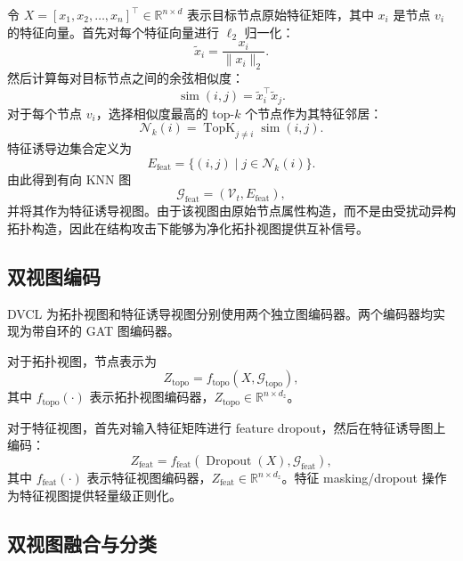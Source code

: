 令 $X=[x_1,x_2,\ldots,x_n]^\top\in\mathbb{R}^{n\times d}$ 表示目标节点原始特征矩阵，其中 $x_i$ 是节点 $v_i$ 的特征向量。首先对每个特征向量进行 $\ell_2$ 归一化：
\begin{equation}
\tilde{x}_i
=
\frac{x_i}{\|x_i\|_2}.
\end{equation}
然后计算每对目标节点之间的余弦相似度：
\begin{equation}
\operatorname{sim}(i,j)
=
\tilde{x}_i^\top \tilde{x}_j.
\end{equation}
对于每个节点 $v_i$，选择相似度最高的 top-$k$ 个节点作为其特征邻居：
\begin{equation}
\mathcal{N}_k(i)
=
\operatorname{TopK}_{j\neq i}
\operatorname{sim}(i,j).
\end{equation}
特征诱导边集合定义为
\begin{equation}
E_{\mathrm{feat}}
=
\{(i,j)\mid j\in\mathcal{N}_k(i)\}.
\end{equation}
由此得到有向 KNN 图
\begin{equation}
\mathcal{G}_{\mathrm{feat}}
=
(\mathcal{V}_t,E_{\mathrm{feat}}),
\end{equation}
并将其作为特征诱导视图。由于该视图由原始节点属性构造，而不是由受扰动异构拓扑构造，因此在结构攻击下能够为净化拓扑视图提供互补信号。

\subsection{双视图编码}

DVCL 为拓扑视图和特征诱导视图分别使用两个独立图编码器。两个编码器均实现为带自环的 GAT 图编码器。

对于拓扑视图，节点表示为
\begin{equation}
Z_{\mathrm{topo}}
=
f_{\mathrm{topo}}(X,\mathcal{G}_{\mathrm{topo}}),
\end{equation}
其中 $f_{\mathrm{topo}}(\cdot)$ 表示拓扑视图编码器，$Z_{\mathrm{topo}}\in\mathbb{R}^{n\times d_z}$。

对于特征视图，首先对输入特征矩阵进行 feature dropout，然后在特征诱导图上编码：
\begin{equation}
Z_{\mathrm{feat}}
=
f_{\mathrm{feat}}(\operatorname{Dropout}(X),\mathcal{G}_{\mathrm{feat}}),
\end{equation}
其中 $f_{\mathrm{feat}}(\cdot)$ 表示特征视图编码器，$Z_{\mathrm{feat}}\in\mathbb{R}^{n\times d_z}$。特征 masking/dropout 操作为特征视图提供轻量级正则化。

\subsection{双视图融合与分类}

